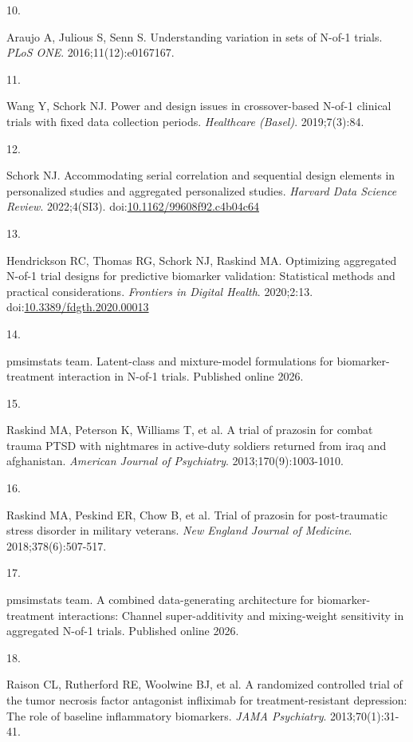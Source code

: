 \documentclass[
  11pt,
]{article}
\newlength{\cslhangindent}
\newlength{\csllabelwidth}
\newenvironment{CSLReferences}[2] %
 {\begin{list}{}{%
  \setlength{\itemindent}{0pt}
  \setlength{\leftmargin}{0pt}
  \setlength{\parsep}{0pt}
  \ifodd #1
   \setlength{\leftmargin}{\cslhangindent}
   \setlength{\itemindent}{-1\cslhangindent}
  \fi
  \setlength{\itemsep}{#2\baselineskip}}}
 {\end{list}}
\newcommand{\CSLLeftMargin}[1]{\parbox[t]{\csllabelwidth}{\strut#1\strut}}
\newcommand{\CSLRightInline}[1]{\parbox[t]{\linewidth - \csllabelwidth}{\strut#1\strut}}
\begin{document}
\begin{CSLReferences}{0}{1}
\CSLLeftMargin{10. }%
\CSLRightInline{Araujo A, Julious S, Senn S. Understanding variation in
sets of {N}-of-1 trials. \emph{PLoS ONE}. 2016;11(12):e0167167.}

\CSLLeftMargin{11. }%
\CSLRightInline{Wang Y, Schork NJ. Power and design issues in
crossover-based {N}-of-1 clinical trials with fixed data collection
periods. \emph{Healthcare (Basel)}. 2019;7(3):84.}

\CSLLeftMargin{12. }%
\CSLRightInline{Schork NJ. Accommodating serial correlation and
sequential design elements in personalized studies and aggregated
personalized studies. \emph{Harvard Data Science Review}. 2022;4(SI3).
doi:\href{https://doi.org/10.1162/99608f92.c4b04c64}{10.1162/99608f92.c4b04c64}}

\CSLLeftMargin{13. }%
\CSLRightInline{Hendrickson RC, Thomas RG, Schork NJ, Raskind MA.
Optimizing aggregated {N}-of-1 trial designs for predictive biomarker
validation: Statistical methods and practical considerations.
\emph{Frontiers in Digital Health}. 2020;2:13.
doi:\href{https://doi.org/10.3389/fdgth.2020.00013}{10.3389/fdgth.2020.00013}}

\CSLLeftMargin{14. }%
\CSLRightInline{{pmsimstats team}. Latent-class and mixture-model
formulations for biomarker-treatment interaction in {N}-of-1 trials.
Published online 2026.}

\CSLLeftMargin{15. }%
\CSLRightInline{{Raskind MA, Peterson K, Williams T, et al.} A trial of
prazosin for combat trauma {PTSD} with nightmares in active-duty
soldiers returned from iraq and afghanistan. \emph{American Journal of
Psychiatry}. 2013;170(9):1003-1010.}

\CSLLeftMargin{16. }%
\CSLRightInline{{Raskind MA, Peskind ER, Chow B, et al.} Trial of
prazosin for post-traumatic stress disorder in military veterans.
\emph{New England Journal of Medicine}. 2018;378(6):507-517.}

\CSLLeftMargin{17. }%
\CSLRightInline{{pmsimstats team}. A combined data-generating
architecture for biomarker-treatment interactions: Channel
super-additivity and mixing-weight sensitivity in aggregated {N}-of-1
trials. Published online 2026.}

\CSLLeftMargin{18. }%
\CSLRightInline{{Raison CL, Rutherford RE, Woolwine BJ, et al.} A
randomized controlled trial of the tumor necrosis factor antagonist
infliximab for treatment-resistant depression: The role of baseline
inflammatory biomarkers. \emph{JAMA Psychiatry}. 2013;70(1):31-41.}


\end{CSLReferences}
\end{document}
